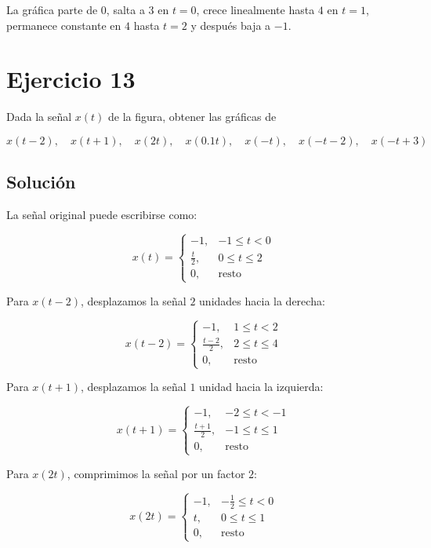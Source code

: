\documentclass[fleqn]{article}
\begin{document}
	La gráfica parte de $0$, salta a $3$ en $t=0$, crece linealmente hasta $4$ en $t=1$, permanece constante en $4$ hasta $t=2$ y después baja a $-1$.

\section{Ejercicio 13}
	Dada la señal $x(t)$ de la figura, obtener las gráficas de

	\[
	x(t-2),\quad x(t+1),\quad x(2t),\quad x(0.1t),
	\quad x(-t),\quad x(-t-2),\quad x(-t+3)
	\]

	\subsection{Solución}

	La señal original puede escribirse como:

	\[
	x(t)=
	\begin{cases}
	-1, & -1\leq t<0 \\[1mm]
	\displaystyle\frac{t}{2}, & 0\leq t\leq2 \\[1mm]
	0, & \text{resto}
	\end{cases}
	\]

	Para $x(t-2)$, desplazamos la señal $2$ unidades hacia la derecha:

	\[
	\boxed{
	x(t-2)=
	\begin{cases}
	-1, & 1\leq t<2 \\[1mm]
	\displaystyle\frac{t-2}{2}, & 2\leq t\leq4 \\[1mm]
	0, & \text{resto}
	\end{cases}
	}
	\]

	Para $x(t+1)$, desplazamos la señal $1$ unidad hacia la izquierda:

	\[
	\boxed{
	x(t+1)=
	\begin{cases}
	-1, & -2\leq t<-1 \\[1mm]
	\displaystyle\frac{t+1}{2}, & -1\leq t\leq1 \\[1mm]
	0, & \text{resto}
	\end{cases}
	}
	\]

	Para $x(2t)$, comprimimos la señal por un factor $2$:

	\[
	\boxed{
	x(2t)=
	\begin{cases}
	-1, & -\frac{1}{2}\leq t<0 \\[1mm]
	t, & 0\leq t\leq1 \\[1mm]
	0, & \text{resto}
	\end{cases}
	}
	\]
\end{document}
